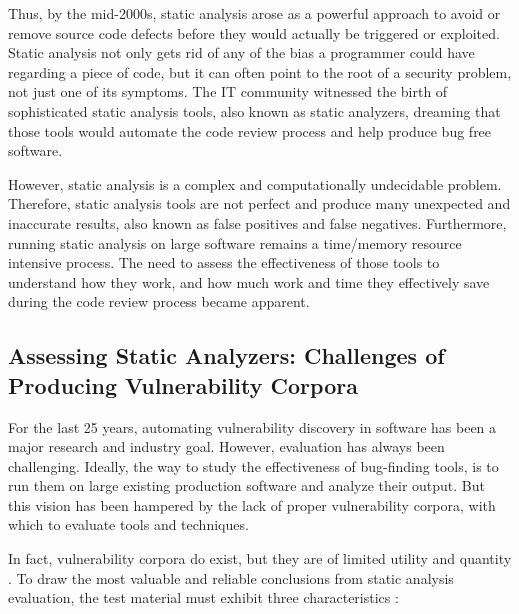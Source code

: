 \vspace{0.3cm}

Thus, by the mid-2000s, static analysis arose as a powerful approach to avoid or remove source code defects before they would actually be triggered or exploited. Static analysis not only gets rid of any of the bias a programmer could have regarding a piece of code, but it can often point to the root of a security problem, not just one of its symptoms. The IT community witnessed the birth of sophisticated static analysis tools, also known as static analyzers, dreaming that those tools would automate the code review process and help produce bug free software.

\vspace{0.3cm}

However, static analysis is a complex and computationally undecidable problem. Therefore, static analysis tools are not perfect and produce many unexpected and inaccurate results, also known as false positives and false negatives. Furthermore, running static analysis on large software remains a time/memory resource intensive process. The need to assess the effectiveness of those tools to understand how they work, and how much work and time they effectively save during the code review process became apparent.

\subsection[Assessing Static Analyzers]{Assessing Static Analyzers: Challenges of Producing Vulnerability Corpora}

\vspace{1cm}

For the last 25 years, automating \gls{vulnerability} discovery in software has been a major research and industry goal. However, evaluation has always been challenging. Ideally, the way to study the effectiveness of bug-finding tools, is to run them on large existing production software and analyze their output. But this vision has been hampered by the lack of proper \gls{vulnerability} corpora, with which to evaluate tools and techniques.

\vspace{0.3cm}

In fact, \gls{vulnerability} corpora do exist, but they are of limited utility and quantity \cite{kass2005nist}. To draw the most valuable and reliable conclusions from static analysis evaluation, the test material must exhibit three characteristics \cite{delaitre2013massive,delaitre2015evaluating}:

